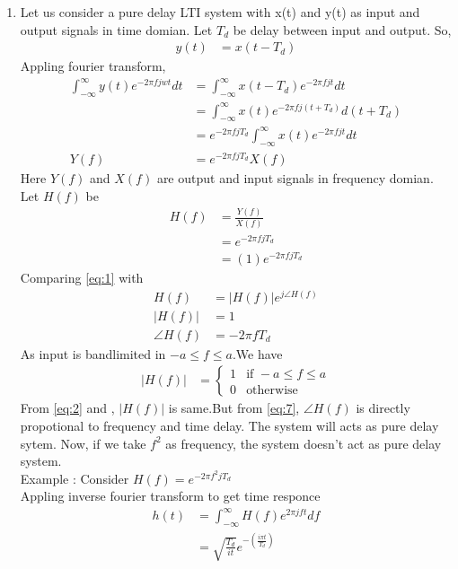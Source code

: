 \documentclass[journal,12pt,twocolumn]{IEEEtran}
\theoremstyle{remark}
\begin{document}
\begin{enumerate}
\item Let us consider a pure delay LTI system with x(t) and y(t) as input and output signals in time domian. Let $T_d$ be delay between input and output. So,
\begin{align}
y(t)&=x(t-T_d)
\end{align}
Appling fourier transform,
\begin{align}
\int_{-\infty}^{\infty}y(t)e^{-2\pi fjwt}dt&=\int_{-\infty}^{\infty}x(t-T_d)e^{-2\pi fjt}dt\\
&=\int_{-\infty}^{\infty}x(t)e^{-2\pi fj(t+T_d)}d(t+T_d)\\
&=e^{-2\pi fjT_d}\int_{-\infty}^{\infty}x(t)e^{-2\pi fjt}dt\\
Y(f)&=e^{-2\pi fjT_d}X(f)
\end{align}
Here $Y(f)$ and $X(f)$ are output and input signals in frequency domian. Let $H(f)$ be 
\begin{align}
H(f)&=\frac{Y(f)}{X(f)}\\
&=e^{-2\pi fjT_d}\\
&=(1)e^{-2\pi fjT_d}
\label{eq:1}
\end{align}
Comparing \eqref{eq:1} with
\begin{align}
H(f)&=|H(f)|e^{j\angle H(f)}\\
|H(f)|&=1\\
\angle H(f)&=-2\pi fT_d
\label{eq:7}
\end{align}
As input is bandlimited in $-a\leq f \leq a$.We have
\begin{align}
|H(f)| &= 
        \begin{cases}
            1 & \text{if }-a \leq f \leq a\\
            0 & \text{otherwise}
        \end{cases}\label{eq:2}
\end{align}
From \eqref{eq:2} and , $|H(f)|$ is same.But from \eqref{eq:7}, $\angle H(f)$ is directly propotional to frequency and time delay. The system will acts as pure delay sytem. Now, if we take $f^2$ as frequency, the system doesn't act as pure delay system.\\
Example : Consider $H(f)=e^{-2\pi f^2jT_d}$\\
Appling inverse fourier transform to get time responce
\begin{align}
h(t)&=\int_{-\infty}^{\infty}H(f)e^{2\pi jft}df\\
&=\sqrt{\frac{T_d}{it}}e^{-(\frac{i\pi t}{T_d})}
\end{align}

\end{enumerate}
\end{document}
